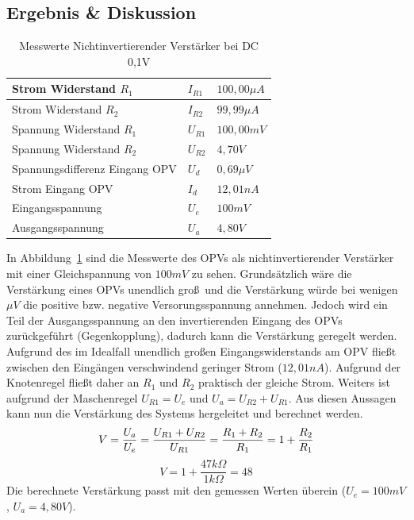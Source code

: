 \documentclass[12pt,a4paper,titlepage]{article}
\begin{document}
\subsection{Ergebnis \& Diskussion}
\begin{table}[H]
\centering
\begin{tabular}{|l|l|l|}
\hline
Strom Widerstand $R_1$ & $I_{R1}$ & $100,00\mu A$  \\ \hline
Strom Widerstand $R_2$ & $I_{R2}$ & $99,99\mu A$  \\ \hline
Spannung Widerstand $R_1$ & $U_{R1}$ & $100,00mV$  \\ \hline
Spannung Widerstand $R_2$ & $U_{R2}$ & $4,70V$ \\ \hline
Spannungsdifferenz Eingang OPV & $U_d$  & $0,69\mu V$      \\ \hline
Strom Eingang OPV & $I_d$  & $12,01nA$ \\ \hline
Eingangsspannung & $U_e$  & $100mV$        \\ \hline
Ausgangsspannung & $U_a$  & $4,80V$   \\ \hline
\end{tabular}
\caption{Messwerte Nichtinvertierender Verst\"arker bei DC 0,1V}
\label{figure02}
\end{table}
\noindent In Abbildung~\ref{figure02} sind die Messwerte des OPVs als nichtinvertierender Verst\"arker mit einer Gleichspannung von $100mV$ zu sehen. Grunds\"atzlich w\"are die Verst\"arkung eines OPVs unendlich gro\ss \, und die Verst\"arkung w\"urde bei wenigen $\mu V$ die positive bzw. negative Versorungsspannung annehmen. Jedoch wird ein Teil der Ausgangsspannung an den invertierenden Eingang des OPVs zur\"uckgef\"uhrt (Gegenkopplung), dadurch kann die Verst\"arkung geregelt werden. Aufgrund des im Idealfall unendlich gro\ss en Eingangswiderstands am OPV flie\ss t zwischen den Eing\"angen verschwindend geringer Strom ($12,01nA$). Aufgrund der Knotenregel flie\ss t daher an $R_1$ und $R_2$ praktisch der gleiche Strom. Weiters ist aufgrund der Maschenregel $U_{R1} = U_e$ und $U_a = U_{R2} + U_{R1}$. Aus diesen Aussagen kann nun die Verst\"arkung des Systems hergeleitet und berechnet werden.\\
\begin{equation*}
  V = \frac{U_a}{U_e} = \frac{U_{R1} + U_{R2}}{U_{R1}} = \frac{R_1 + R_2}{R_1} = 1+ \frac{R_2}{R_1} \\
\end{equation*}
\begin{equation*}
  V = 1 + \frac{47 k\Omega}{1 k\Omega} = 48
\end{equation*}
\noindent Die berechnete Verst\"arkung passt mit den gemessen Werten \"uberein ($U_e = 100mV$, $U_a = 4,80V$).
\end{document}
